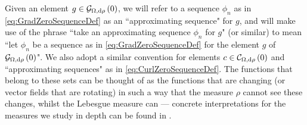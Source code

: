 Given an element $g\in\mathcal{G}_{ \Omega, \mathrm{d}\rho}\left( 0 \right)$, we will refer to a sequence $\phi_n$ as in \eqref{eq:GradZeroSequenceDef} as an ``approximating sequence" for $g$, and will make use of the phrase ``take an approximating sequence $\phi_n$ for $g$" (or similar) to mean ``let $\phi_n$ be a sequence as in \eqref{eq:GradZeroSequenceDef} for the element $g$ of $\mathcal{G}_{ \Omega, \mathrm{d}\rho}\left( 0 \right)$".
We also adopt a similar convention for elements $c\in\mathcal{C}_{ \Omega, \mathrm{d}\rho}\left( 0 \right)$ and ``approximating sequences" as in \eqref{eq:CurlZeroSequenceDef}.
The functions that belong to these sets can be thought of as the functions that are changing (or vector fields that are rotating) in such a way that the measure $\rho$ cannot see these changes, whilst the Lebesgue measure can --- concrete interpretations for the measures we study in depth can be found in .


